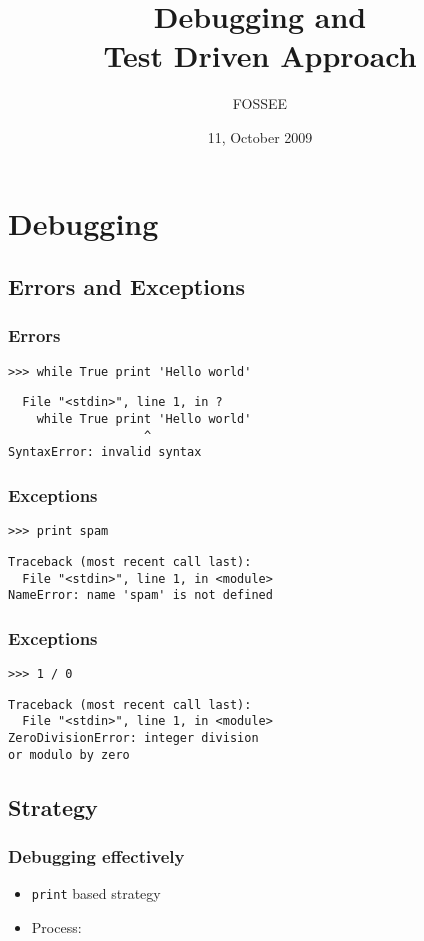 \documentclass[compress,14pt]{beamer}
\title[]{Debugging and \\Test Driven Approach}
\author[FOSSEE] {FOSSEE}
\institute[IIT Bombay] {Department of Aerospace Engineering\\IIT Bombay}
\date[] {11, October 2009}
\date[] %
\newcommand{\typ}[1]{\lstinline{#1}}
\begin{document}
\begin{frame}
  \maketitle
\end{frame}


\section{Debugging}
\subsection{Errors and Exceptions}
\begin{frame}[fragile]
 \frametitle{Errors}
 \begin{lstlisting}
>>> while True print 'Hello world'
 \end{lstlisting}
\pause
  \begin{lstlisting}
  File "<stdin>", line 1, in ?
    while True print 'Hello world'
                   ^
SyntaxError: invalid syntax
\end{lstlisting}
\end{frame}

\begin{frame}[fragile]
 \frametitle{Exceptions}
 \begin{lstlisting}
>>> print spam
\end{lstlisting}
\pause
\begin{lstlisting}
Traceback (most recent call last):
  File "<stdin>", line 1, in <module>
NameError: name 'spam' is not defined
\end{lstlisting}
\end{frame}

\begin{frame}[fragile]
 \frametitle{Exceptions}
 \begin{lstlisting}
>>> 1 / 0
\end{lstlisting}
\pause
\begin{lstlisting}
Traceback (most recent call last):
  File "<stdin>", line 1, in <module>
ZeroDivisionError: integer division 
or modulo by zero
\end{lstlisting}
\end{frame}

\subsection{Strategy}
\begin{frame}[fragile]
    \frametitle{Debugging effectively}
    \begin{itemize}
        \item \typ{print} based strategy
        \item Process:
    \end{itemize}
\begin{center}
\end{center}
\end{frame}
\end{document}
